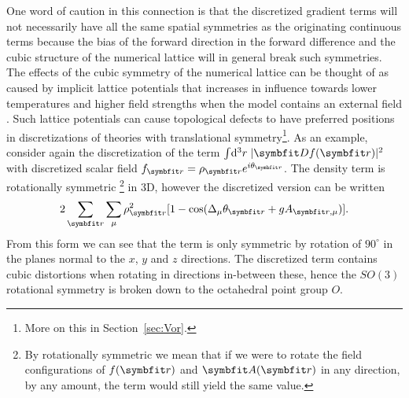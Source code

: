 One word of caution in this connection is that the discretized gradient terms will not necessarily have all the same spatial symmetries
as the originating continuous terms because the bias of the forward direction in the forward difference and the cubic structure of the numerical
lattice will in general break such symmetries. The effects of the cubic symmetry of the numerical lattice can be thought of as caused by
implicit lattice potentials that increases in influence towards lower temperatures and higher field strengths when the model contains an external
field
. Such lattice potentials can \eg cause topological defects to have
preferred positions in discretizations of theories with translational symmetry\footnote{More on this in Section~\ref{sec:Vor}.}.
As an example, consider again the discretization of the term
$\int\!\mathrm{d}^3r\;|\v{D}f(\v{r})|^2$ with discretized scalar field $f_\v{r}=\rho_\v{r}e^{i\theta_\v{r}}$. The density term is rotationally
symmetric%
\footnote{By rotationally symmetric we mean that if we were to rotate the field configurations of $f(\v{r})$ and $\v{A}(\v{r})$ in any direction,
by any amount, the term would still yield the same value.}
 in $3$D, however the discretized version can be written
\begin{equation}
    \label{eq:LM:Derivatives:discretizedKineticTerm}
    2\sum_\v{r}\sum_\mu\rho_\v{r}^2[1-\cos(\Delta_\mu \theta_\v{r}+gA_{\v{r},\mu})].
\end{equation}
From this form we can see that the term is only symmetric by rotation of $90^\circ$ in the planes normal to the $x$, $y$ and $z$ directions.
The discretized term contains cubic distortions when rotating in directions in-between these, hence the $SO(3)$ rotational symmetry is broken
down to the octahedral point group $O$.

